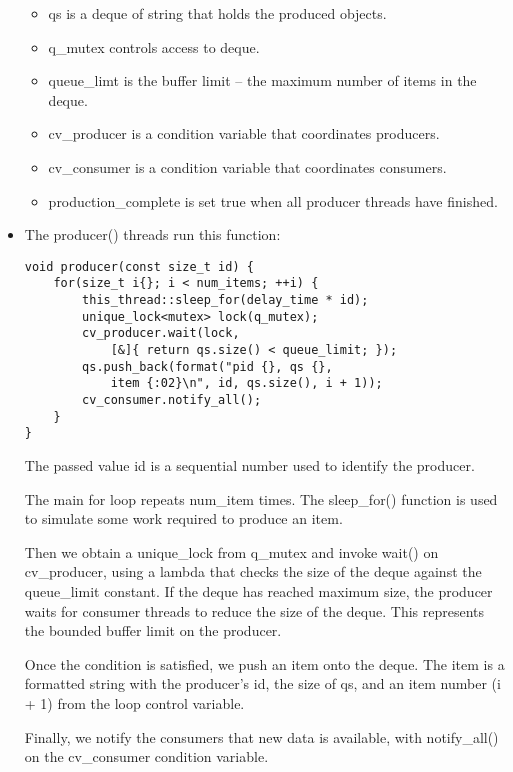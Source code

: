 \begin{itemize}
\begin{itemize}
\item 
qs is a deque of string that holds the produced objects.

\item 
q\_mutex controls access to deque.

\item 
queue\_limt is the buffer limit – the maximum number of items in the deque.

\item 
cv\_producer is a condition variable that coordinates producers.

\item 
cv\_consumer is a condition variable that coordinates consumers.

\item 
production\_complete is set true when all producer threads have finished.
\end{itemize}

\item 
The producer() threads run this function:

\begin{lstlisting}[style=styleCXX]
void producer(const size_t id) {
	for(size_t i{}; i < num_items; ++i) {
		this_thread::sleep_for(delay_time * id);
		unique_lock<mutex> lock(q_mutex);
		cv_producer.wait(lock,
			[&]{ return qs.size() < queue_limit; });
		qs.push_back(format("pid {}, qs {},
			item {:02}\n", id, qs.size(), i + 1));
		cv_consumer.notify_all();
	}
}
\end{lstlisting}

The passed value id is a sequential number used to identify the producer.

The main for loop repeats num\_item times. The sleep\_for() function is used to simulate some work required to produce an item.

Then we obtain a unique\_lock from q\_mutex and invoke wait() on cv\_producer, using a lambda that checks the size of the deque against the queue\_limit constant. If the deque has reached maximum size, the producer waits for consumer threads to reduce the size of the deque. This represents the bounded buffer limit on the producer.

Once the condition is satisfied, we push an item onto the deque. The item is a formatted string with the producer's id, the size of qs, and an item number (i + 1) from the loop control variable.

Finally, we notify the consumers that new data is available, with notify\_all() on the cv\_consumer condition variable.


\end{itemize}
